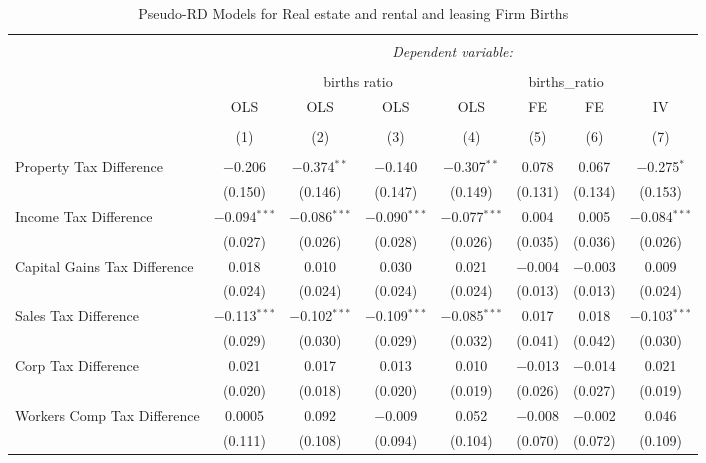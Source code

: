 
\begin{table}[!htbp] \centering 
  \caption{Pseudo-RD Models for  Real estate and rental and leasing Firm Births} 
  \label{} 
\begin{tabular}{@{\extracolsep{5pt}}lccccccc} 
\\[-1.8ex]\hline 
\hline \\[-1.8ex] 
 & \multicolumn{7}{c}{\textit{Dependent variable:}} \\ 
\cline{2-8} 
\\[-1.8ex] & \multicolumn{4}{c}{births ratio} & \multicolumn{2}{c}{births\_ratio} &   \\ 
 & OLS & OLS & OLS & OLS & FE & FE & IV \\ 
\\[-1.8ex] & (1) & (2) & (3) & (4) & (5) & (6) & (7)\\ 
\hline \\[-1.8ex] 
 Property Tax Difference & $-$0.206 & $-$0.374$^{**}$ & $-$0.140 & $-$0.307$^{**}$ & 0.078 & 0.067 & $-$0.275$^{*}$ \\ 
  & (0.150) & (0.146) & (0.147) & (0.149) & (0.131) & (0.134) & (0.153) \\ 
  Income Tax Difference & $-$0.094$^{***}$ & $-$0.086$^{***}$ & $-$0.090$^{***}$ & $-$0.077$^{***}$ & 0.004 & 0.005 & $-$0.084$^{***}$ \\ 
  & (0.027) & (0.026) & (0.028) & (0.026) & (0.035) & (0.036) & (0.026) \\ 
  Capital Gains Tax Difference & 0.018 & 0.010 & 0.030 & 0.021 & $-$0.004 & $-$0.003 & 0.009 \\ 
  & (0.024) & (0.024) & (0.024) & (0.024) & (0.013) & (0.013) & (0.024) \\ 
  Sales Tax Difference & $-$0.113$^{***}$ & $-$0.102$^{***}$ & $-$0.109$^{***}$ & $-$0.085$^{***}$ & 0.017 & 0.018 & $-$0.103$^{***}$ \\ 
  & (0.029) & (0.030) & (0.029) & (0.032) & (0.041) & (0.042) & (0.030) \\ 
  Corp Tax Difference & 0.021 & 0.017 & 0.013 & 0.010 & $-$0.013 & $-$0.014 & 0.021 \\ 
  & (0.020) & (0.018) & (0.020) & (0.019) & (0.026) & (0.027) & (0.019) \\ 
  Workers Comp Tax Difference & 0.0005 & 0.092 & $-$0.009 & 0.052 & $-$0.008 & $-$0.002 & 0.046 \\ 
  & (0.111) & (0.108) & (0.094) & (0.104) & (0.070) & (0.072) & (0.109) \\ 

\end{tabular}
\end{table}
